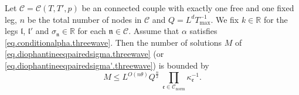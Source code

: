 \begin{prop}\label{prop.counting}
Let $\mathcal{C}=\mathcal{C}(T,T',p)$ be an connected couple with exactly one free and one fixed leg, $n$ be the total number of nodes in $\mathcal{C}$ and $Q=L^{d}T^{-1}_{\text{max}}$. We fix $k\in \mathbb{R}$ for the legs $\mathfrak{l}$, $\mathfrak{l}'$ and $\sigma_{\mathfrak{n}}\in\mathbb{R}$ for each $\mathfrak{n}\in \mathcal{C}$. Assume that $\alpha$ satisfies \eqref{eq.conditionalpha.threewave}. Then the number of solutions $M$ of \eqref{eq.diophantineeqpairedsigma.threewave} (or \eqref{eq.diophantineeqpairedsigma'.threewave}) is bounded by 
\begin{equation}\label{eq.countingbd0.threewave}
M\leq L^{O(n\theta)} Q^{\frac{n}{2}}\ \prod_{\mathfrak{e}\in \mathcal{C}_{\text{norm}}} \kappa^{-1}_{\mathfrak{e}}.
\end{equation}
\end{prop}
